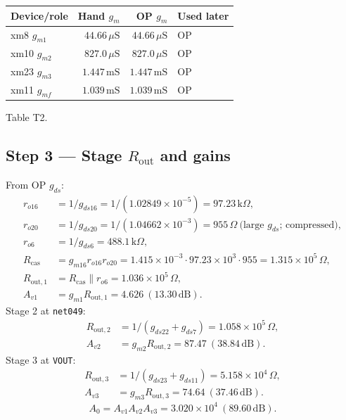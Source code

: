 \documentclass[11pt]{article}
\begin{document}
\begin{center}
\begin{tabular}{lrrl}
\toprule
Device/role & Hand \(g_m\) & OP \(g_m\) & Used later \\
\midrule
xm8 \(g_{m1}\) & \(44.66\,\mu\mathrm{S}\) & \(44.66\,\mu\mathrm{S}\) & OP \\
xm10 \(g_{m2}\) & \(827.0\,\mu\mathrm{S}\) & \(827.0\,\mu\mathrm{S}\) & OP \\
xm23 \(g_{m3}\) & \(1.447\,\mathrm{mS}\) & \(1.447\,\mathrm{mS}\) & OP \\
xm11 \(g_{mf}\) & \(1.039\,\mathrm{mS}\) & \(1.039\,\mathrm{mS}\) & OP \\
\bottomrule
\end{tabular}
\end{center}
\footnotesize Table T2.

\subsection{Step 3 --- Stage \(R_{\mathrm{out}}\) and gains}
From OP \(g_{ds}\):
\begin{align*}
r_{o16}&=1/g_{ds16}=1/(1.02849\times10^{-5})=97.23\,\mathrm{k}\Omega,\\
r_{o20}&=1/g_{ds20}=1/(1.04662\times10^{-3})=955\,\Omega\ \text{(large \(g_{ds}\); compressed)},\\
r_{o6}&=1/g_{ds6}=488.1\,\mathrm{k}\Omega,\\
R_{\mathrm{cas}}&=g_{m16} r_{o16} r_{o20}=1.415\times10^{-3}\cdot97.23\times10^{3}\cdot955=1.315\times10^{5}\,\Omega,\\
R_{\mathrm{out},1}&=R_{\mathrm{cas}}\parallel r_{o6}=1.036\times10^{5}\,\Omega,\\
A_{v1}&=g_{m1}R_{\mathrm{out},1}=4.626\ (13.30\,\mathrm{dB}).
\end{align*}
Stage 2 at \texttt{net049}:
\begin{align*}
R_{\mathrm{out},2}&=1/(g_{ds22}+g_{ds7})=1.058\times10^{5}\,\Omega,\\
A_{v2}&=g_{m2}R_{\mathrm{out},2}=87.47\ (38.84\,\mathrm{dB}).
\end{align*}
Stage 3 at \texttt{VOUT}:
\begin{align*}
R_{\mathrm{out},3}&=1/(g_{ds23}+g_{ds11})=5.158\times10^{4}\,\Omega,\\
A_{v3}&=g_{m3}R_{\mathrm{out},3}=74.64\ (37.46\,\mathrm{dB}).
\end{align*}
\[
A_0=A_{v1}A_{v2}A_{v3}=3.020\times10^{4}\ (89.60\,\mathrm{dB}).
\]
\end{document}
